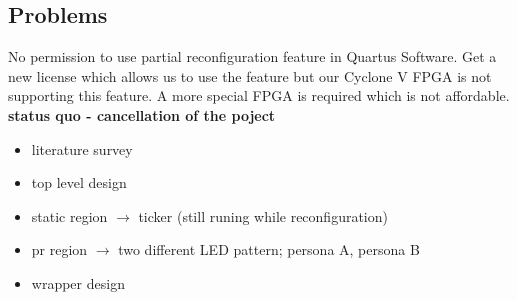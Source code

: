 \subsection{Problems}
No permission to use partial reconfiguration feature in Quartus Software.
Get a new license which allows us to use the feature but our Cyclone V FPGA is not supporting this
feature. A more special FPGA is required which is not affordable.\\
\textbf{status quo - cancellation of the poject}\\
\begin{itemize}
  \item literature survey
  \item top level design
  \item static region $\rightarrow$ ticker (still runing while reconfiguration)
  \item pr region $\rightarrow$ two different LED pattern; persona A, persona B
  \item wrapper design 
\end{itemize}
